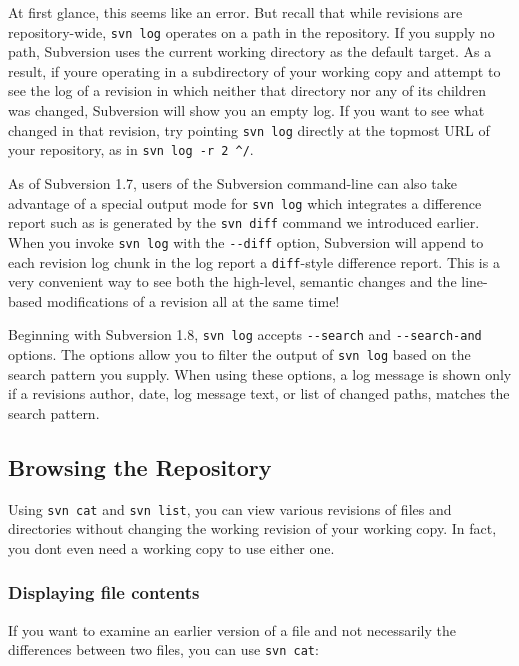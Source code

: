 At first glance, this seems like an error. But recall that while
revisions are repository-wide, \texttt{svn\ log} operates on a path in
the repository. If you supply no path, Subversion uses the current
working directory as the default target. As a result, if
you\textquotesingle re operating in a subdirectory of your working copy
and attempt to see the log of a revision in which neither that directory
nor any of its children was changed, Subversion will show you an empty
log. If you want to see what changed in that revision, try pointing
\texttt{svn\ log} directly at the topmost URL of your repository, as in
\texttt{svn\ log\ -r\ 2\ \^{}/}.

As of Subversion 1.7, users of the Subversion command-line can also take
advantage of a special output mode for \texttt{svn\ log} which
integrates a difference report such as is generated by the
\texttt{svn\ diff} command we introduced earlier. When you invoke
\texttt{svn\ log} with the \texttt{-\/-diff} option, Subversion will
append to each revision log chunk in the log report a
\texttt{diff}-style difference report. This is a very convenient way to
see both the high-level, semantic changes and the line-based
modifications of a revision all at the same time!

Beginning with Subversion 1.8, \texttt{svn\ log} accepts
\texttt{-\/-search} and \texttt{-\/-search-and} options. The options
allow you to filter the output of \texttt{svn\ log} based on the search
pattern you supply. When using these options, a log message is shown
only if a revision\textquotesingle s author, date, log message text, or
list of changed paths, matches the search pattern.

\subsection{Browsing the Repository}\label{svn.tour.history.browsing}

Using \texttt{svn\ cat} and \texttt{svn\ list}, you can view various
revisions of files and directories without changing the working revision
of your working copy. In fact, you don\textquotesingle t even need a
working copy to use either one.

\subsubsection{Displaying file
contents}\label{svn.tour.history.browsing.cat}

If you want to examine an earlier version of a file and not necessarily
the differences between two files, you can use \texttt{svn\ cat}:

